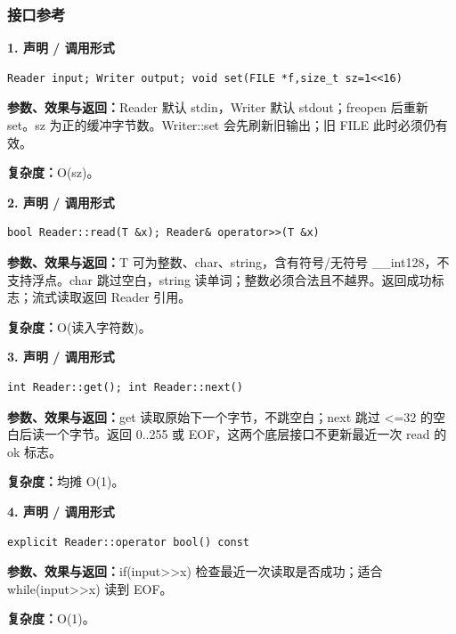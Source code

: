\documentclass[UTF8,a4paper,10pt]{ctexart}
\begin{document}
\subsubsection*{接口参考}
\noindent\begin{minipage}{\textwidth}
\textbf{1. 声明 / 调用形式}
\begin{lstlisting}
Reader input; Writer output; void set(FILE *f,size_t sz=1<<16)
\end{lstlisting}
\textbf{参数、效果与返回：}Reader 默认 stdin，Writer 默认 stdout；freopen 后重新 set。sz 为正的缓冲字节数。Writer::set 会先刷新旧输出；旧 FILE 此时必须仍有效。

\textbf{复杂度：}O(sz)。

\end{minipage}\par\vspace{0.4em}
\noindent\begin{minipage}{\textwidth}
\textbf{2. 声明 / 调用形式}
\begin{lstlisting}
bool Reader::read(T &x); Reader& operator>>(T &x)
\end{lstlisting}
\textbf{参数、效果与返回：}T 可为整数、char、string，含有符号/无符号 \_\_int128，不支持浮点。char 跳过空白，string 读单词；整数必须合法且不越界。返回成功标志；流式读取返回 Reader 引用。

\textbf{复杂度：}O(读入字符数)。

\end{minipage}\par\vspace{0.4em}
\noindent\begin{minipage}{\textwidth}
\textbf{3. 声明 / 调用形式}
\begin{lstlisting}
int Reader::get(); int Reader::next()
\end{lstlisting}
\textbf{参数、效果与返回：}get 读取原始下一个字节，不跳空白；next 跳过 <=32 的空白后读一个字节。返回 0..255 或 EOF，这两个底层接口不更新最近一次 read 的 ok 标志。

\textbf{复杂度：}均摊 O(1)。

\end{minipage}\par\vspace{0.4em}
\noindent\begin{minipage}{\textwidth}
\textbf{4. 声明 / 调用形式}
\begin{lstlisting}
explicit Reader::operator bool() const
\end{lstlisting}
\textbf{参数、效果与返回：}if(input>>x) 检查最近一次读取是否成功；适合 while(input>>x) 读到 EOF。

\textbf{复杂度：}O(1)。

\end{minipage}\par\vspace{0.4em}
\end{document}
